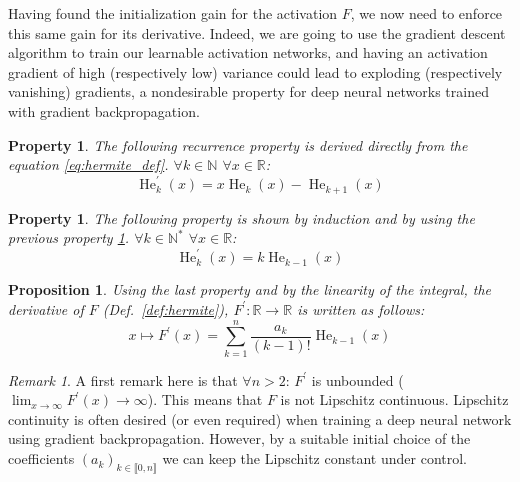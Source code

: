 \documentclass{article} %
\theoremstyle{plain}
\newtheorem{proposition}[theorem]{Proposition}
\newtheorem{property}[theorem]{Property}
\theoremstyle{definition}
\theoremstyle{remark}
\newtheorem{remark}[theorem]{Remark}
\begin{document}
Having found the initialization gain for the activation $F$, we now need to enforce this same gain for its derivative. Indeed, we are going to use the gradient descent algorithm to train our learnable activation networks, and having an activation gradient of high (respectively low) variance could lead to exploding (respectively vanishing) gradients, a nondesirable property for deep neural networks trained with gradient backpropagation.
\begin{property}
The following recurrence property is derived directly from the equation \ref{eq:hermite_def}. $\forall k \in \mathbb{N}$ $\forall x \in \mathbb{R}$:
\begin{equation}
    \operatorname{He}_{k}^\prime(x) = x \operatorname{He}_{k}(x) - \operatorname{He}_{k+1}(x)
\end{equation}
\label{prop:hermite_deriv}
\end{property}
\begin{property}
\label{prop:hermite_deriv2}
The following property is shown by induction and by using the previous property \ref{prop:hermite_deriv}. $\forall k \in \mathbb{N}^*$ $\forall x \in \mathbb{R}$:
\begin{equation}
    \operatorname{He}_k^\prime(x) = k \operatorname{He}_{k-1}(x)
\end{equation}
\end{property}
\begin{proposition}
Using the last property and by the linearity of the integral, the derivative of $F$ (Def.~\ref{def:hermite}), $F^\prime \colon  \mathbb{R} \to \mathbb{R} $ is written as follows:
\begin{equation}
     x \mapsto F^\prime(x)=\sum^{n}_{k=1} \frac{a_k} {(k-1)!}\operatorname{He}_{k-1}(x)
\end{equation}
\end{proposition}
\begin{remark}
    \label{remark:hermite_lip} 
    A first remark here is that $\forall n >2$: $F^\prime$ is unbounded ($\displaystyle{\lim_{x\to\infty} F^\prime(x) \to \infty}$). This means that $F$ is not Lipschitz continuous. Lipschitz continuity is often desired (or even required) when training a deep neural network using gradient backpropagation. However, by a suitable initial choice of the coefficients $(a_k)_{k \in  \llbracket 0,n \rrbracket}$ we can keep the Lipschitz constant under control. 
\end{remark}
\end{document}
